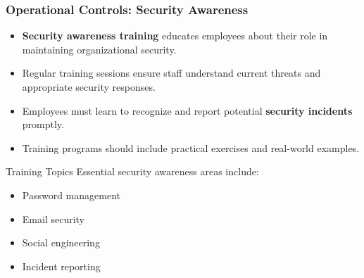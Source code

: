 \documentclass{beamer}
\begin{document}
\begin{frame}
    \frametitle{Operational Controls: Security Awareness}
    
    \begin{itemize}
        \item \textbf{Security awareness training} educates employees about their role in maintaining organizational security.
        
        \item Regular training sessions ensure staff understand current threats and appropriate security responses.
        
        \item Employees must learn to recognize and report potential \textbf{security incidents} promptly.
        
        \item Training programs should include practical exercises and real-world examples.
    \end{itemize}
    
    \begin{exampleblock}{Training Topics}
        Essential security awareness areas include:
        \begin{itemize}
            \item Password management
            \item Email security
            \item Social engineering
            \item Incident reporting
        \end{itemize}
    \end{exampleblock}
\end{frame}
\end{document}
